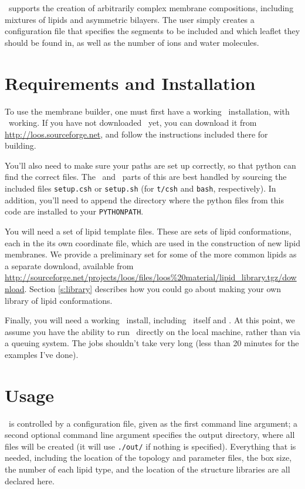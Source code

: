 \documentclass[12pt]{article}
\begin{document}
\omgwtf\ supports the creation of arbitrarily complex membrane compositions,
including mixtures of lipids and asymmetric bilayers.  The user simply
creates a configuration file that specifies the segments to be included and
which leaflet they should be found in, as well as the number of ions and
water molecules.  

\section{Requirements and Installation}
\label{s:install}

To use the membrane builder, one must first have a working \loos\
installation, with \pyloos\ working.  If you have not downloaded \loos\
yet, you can download it from \url{http://loos.sourceforge.net}, and follow
the instructions included there for building.  

You'll also need to make sure your paths are set up correctly, so that python
can find the correct files.  The \loos\ and \pyloos\ parts of this are best
handled by sourcing the included files {\tt setup.csh} or {\tt setup.sh} (for
{\tt t/csh} and {\tt bash}, respectively).  In addition, you'll need to
append the directory where the python files from this code are installed to
your {\tt PYTHONPATH}.

You will need a set of lipid template files.  These are sets of
lipid conformations, each in the its own coordinate file, which are used in
the construction of new lipid membranes.  We provide a preliminary set for
some of the more common lipids as a separate download, available from
\url{http://sourceforge.net/projects/loos/files/loos\%20material/lipid_library.tgz/download}.   Section \ref{s:library} describes 
how you could go about making your own library of lipid conformations.

Finally, you will need a working \namd\ install, including \namd\ itself and
\psfgen.  At this point, we assume you have the ability to run \namd\
directly on the local machine, rather than via a queuing system.  The jobs
shouldn't take very long (less than 20 minutes for the examples I've done).

\section{Usage}
\label{s:usage}

\omgwtf\ is controlled by a configuration file, given as the first command
line argument; a second optional command line argument specifies the output
directory, where all files will be created (it will use {\tt ./out/} if
nothing is specified).  Everything that is needed, including the location of
the topology and parameter files, the box size, the number of each lipid
type, and the location of the structure libraries are all declared here.
\end{document}

